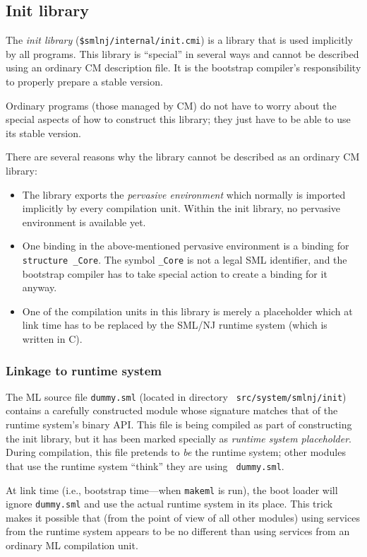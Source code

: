 \subsection{Init library}

The {\em init library} ({\tt \$smlnj/internal/init.cmi}) is a library
that is used implicitly by all programs.  This library is ``special''
in several ways and cannot be described using an ordinary CM
description file.  It is the bootstrap compiler's responsibility to
properly prepare a stable version.

Ordinary programs (those managed by CM) do not have to worry about the
special aspects of how to construct this library; they just have to be
able to use its stable version.

There are several reasons why the library cannot be described as an
ordinary CM library:

\begin{itemize}
\item The library exports the {\em pervasive environment} which
normally is imported implicitly by every compilation unit.  Within the
init library, no pervasive environment is available yet.
\item One binding in the above-mentioned pervasive environment is a
binding for {\tt structure \_Core}.  The symbol {\tt \_Core} is not a
legal SML identifier, and the bootstrap compiler has to take special
action to create a binding for it anyway.
\item One of the compilation units in this library is merely a
placeholder which at link time has to be replaced by the SML/NJ
runtime system (which is written in C).
\end{itemize}

\subsubsection{Linkage to runtime system}

The ML source file {\tt dummy.sml} (located in directory {\tt
src/system/smlnj/init}) contains a carefully constructed module whose
signature matches that of the runtime system's binary API.  This file
is being compiled as part of constructing the init library, but it has
been marked specially as {\em runtime system placeholder}.  During
compilation, this file pretends to {\em be} the runtime system; other
modules that use the runtime system ``think'' they are using {\tt
dummy.sml}.

At link time (i.e., bootstrap time---when {\tt makeml} is run), the
boot loader will ignore {\tt dummy.sml} and use the actual runtime
system in its place.  This trick makes it possible that (from the
point of view of all other modules) using services from the runtime
system appears to be no different than using services from an ordinary
ML compilation unit.

